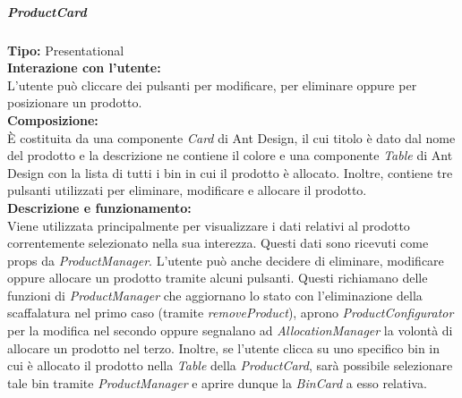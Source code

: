 \subparagraph{\colorbox{verde_uml}{ProductCard}}
\textbf{Tipo:} Presentational \\
\textbf{Interazione con l'utente:} \\
L'utente può cliccare dei pulsanti per modificare, per eliminare oppure per posizionare un prodotto.\\
\textbf{Composizione:} \\
È costituita da una componente \textit{Card} di Ant Design, il cui titolo è dato dal nome del prodotto e la descrizione ne contiene il colore e una componente \textit{Table} di Ant Design con la lista di tutti i bin in cui il prodotto è allocato. Inoltre, contiene tre pulsanti utilizzati per eliminare, modificare e allocare il prodotto.\\
\textbf{Descrizione e funzionamento:} \\
Viene utilizzata principalmente per visualizzare i dati relativi al prodotto correntemente selezionato nella sua interezza. Questi dati sono ricevuti come props da \textit{ProductManager}.  L'utente può anche decidere di eliminare, modificare oppure allocare un prodotto tramite alcuni pulsanti. Questi richiamano delle funzioni di \textit{ProductManager} che aggiornano lo stato con l'eliminazione della scaffalatura nel primo caso (tramite \textit{removeProduct}), aprono \textit{ProductConfigurator} per la modifica nel secondo oppure segnalano ad \textit{AllocationManager} la volontà di allocare un prodotto nel terzo. Inoltre, se l'utente clicca su uno specifico bin in cui è allocato il prodotto nella \textit{Table} della \textit{ProductCard}, sarà possibile selezionare tale bin tramite \textit{ProductManager} e aprire dunque la \textit{BinCard} a esso relativa.


